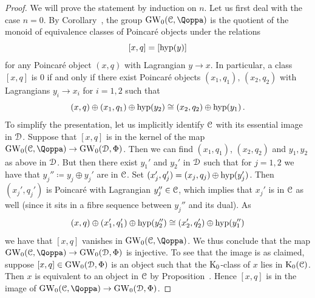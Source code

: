 \begin{proof}%
We will prove the statement by induction on $n$. Let us first deal with the case $n=0$. By Corollary~, the group $\GW_0(\C,\QF)$ is the quotient of the monoid of equivalence classes of Poincaré objects under the relations
\[
[x,q]=[\mathrm{hyp}(y)]
\]
for any Poincar\'e object $(x,q)$ with Lagrangian $y\to x$. In particular, a class $[x,q]$ is 0 if and only if there exist Poincar\'e objects $(x_1,q_1),\,(x_2,q_2)$ with Lagrangians $y_i \to x_i$ for $i=1,2$ such that
\[
(x,q)\oplus (x_1,q_1)\oplus \mathrm{hyp}(y_2)\cong (x_2,q_2)\oplus \mathrm{hyp}(y_1)\,.
\]
To simplify the presentation, let us implicitly identify $\mathcal C$ with its essential image in $\mathcal{D}$.
Suppose that $[x,q]$ is in the kernel of the map $\GW_0(\C,\QF)\to \GW_0(\D,\QFD)$. Then we can find $(x_1,q_1)$, $(x_2,q_2)$ and $y_1,y_2$ as above in $\mathcal{D}$. But then there exist $y_1'$ and $y_2'$ in $\mathcal{D}$ such that for $j=1,2$ we have that $y_j'' \coloneq y_j\oplus y_j'$ are in $\mathcal C$. Set $(x_j',q_j') = (x_j,q_j) \oplus \mathrm{hyp}(y_j')$. Then $(x_j',q_j')$ is Poincar\'e with Lagrangian $y_j''  \in \mathcal C$, which implies that $x_j'$ is in $\mathcal C$ as well (since it sits in a fibre sequence between $y_j''$ and its dual). As
\[
(x,q)\oplus (x_1',q_1')\oplus \mathrm{hyp}(y''_2)\cong (x_2',q_2')\oplus \mathrm{hyp}(y_1'')
\]
we have that 
$[x,q]$ vanishes in $\GW_0(\C,\QF)$. We thus conclude that the map $\GW_0(\C,\QF) \to \GW_0(\D,\QFD)$ is injective.
To see that the image is as claimed, suppose $[x,q]\in \operatorname{GW}_0(\mathcal{D},\Phi)$ is an object such that the $\operatorname K_0$-class of $x$ lies in $\operatorname K_0(\mathcal C)$. Then $x$ is equivalent to an object in $\mathcal C$ by Proposition~. Hence $[x,q]$ is in the image of $\GW_0(\C,\QF) \to \GW_0(\D,\QFD)$.
    

\end{proof}
